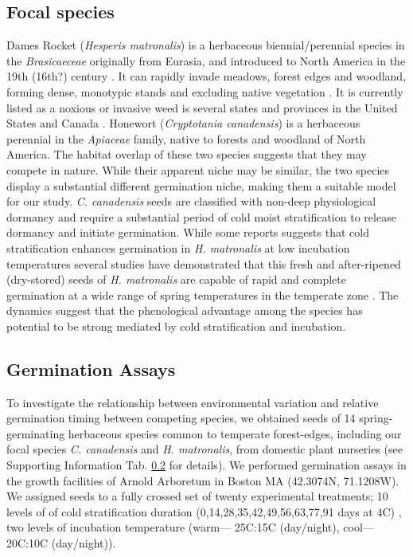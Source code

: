 \documentclass{article}\usepackage[]{graphicx}\usepackage[]{color}
\begin{document}
\subsection{Focal species}
 Dames Rocket (\textit{Hesperis matronalis}) is a herbaceous biennial/perennial species in the \textit{Brasicaeceae} originally from Eurasia, and introduced to North America in the 19th (16th?) century \citep{}. It  can rapidly invade  meadows, forest edges and woodland, forming dense, monotypic stands and excluding native vegetation \citep{}. It is currently listed as a noxious or invasive weed is several states and provinces in the United States and Canada \citep{}. Honewort (\textit{Cryptotania canadensis}) is a herbaceous perennial in the \textit{Apiaceae} family, native to forests and woodland of North America. The  habitat overlap of these two species suggests that they may compete in nature. While their apparent niche may be similar, the two species display a substantial different germination niche, making them a suitable model for our study. \textit{C. canadensis} seeds are classified with non-deep physiological dormancy and require a substantial period of cold moist stratification to release dormancy and initiate germination. While some reports suggests that cold stratification enhances germination in \textit{H. matronalis} at low incubation temperatures \citep{} several studies have demonstrated that this fresh and after-ripened (dry-stored) seeds of \textit{H. matronalis} are capable of rapid and complete germination at a wide range of spring temperatures in the temperate zone \citep{}. The dynamics suggest that the phenological advantage among the species has potential to be strong mediated by cold stratification and incubation.  

\subsection{Germination Assays}

To investigate the relationship between environmental variation and relative germination timing between competing species, we obtained seeds of 14 spring-germinating herbaceous species common to temperate forest-edges, including our focal species  \textit{C. canadensis} and \textit{H. matronalis}, from domestic plant nurseries (see Supporting Information Tab. \ref{} for details). We performed germination assays in the growth facilities of Arnold Arboretum in Boston MA (42.3074\degree N, 71.1208\degree W). We assigned seeds to a fully crossed set of twenty experimental treatments; 10 levels of of cold stratification duration (0,14,28,35,42,49,56,63,77,91 days at 4\degree C) , two levels of incubation temperature (warm--- 25\degree C:15\degree C (day/night), cool--- 20\degree C:10\degree C (day/night)).
\end{document}
